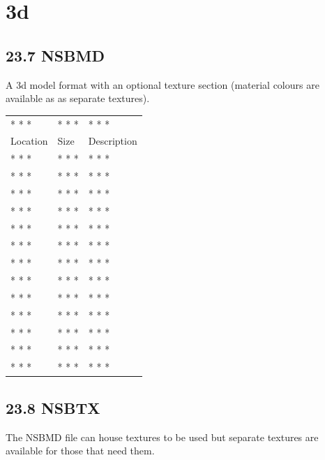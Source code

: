 \documentclass[
]{book}
\begin{document}
\hypertarget{d-2}{%
\chapter{3d}\label{d-2}}

\hypertarget{nsbmd-1}{%
\section{23.7 NSBMD}\label{nsbmd-1}}

A 3d model format with an optional texture section (material colours are available as as separate textures).

\begin{longtable}[]{@{}lll@{}}
\toprule()
\endhead
* * * & * * * & * * * \\
Location & Size & Description \\
* * * & * * * & * * * \\
* * * & * * * & * * * \\
* * * & * * * & * * * \\
* * * & * * * & * * * \\
* * * & * * * & * * * \\
* * * & * * * & * * * \\
* * * & * * * & * * * \\
* * * & * * * & * * * \\
* * * & * * * & * * * \\
* * * & * * * & * * * \\
* * * & * * * & * * * \\
* * * & * * * & * * * \\
* * * & * * * & * * * \\
\bottomrule()
\end{longtable}

\hypertarget{nsbtx}{%
\section{23.8 NSBTX}\label{nsbtx}}

The NSBMD file can house textures to be used but separate textures are available for those that need them.
\end{document}

